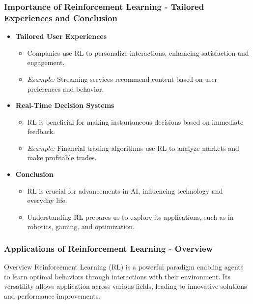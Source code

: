 \documentclass[aspectratio=169]{beamer}
\begin{document}
\begin{frame}[fragile]
  \frametitle{Importance of Reinforcement Learning - Tailored Experiences and Conclusion}
  \begin{itemize}
    \item \textbf{Tailored User Experiences}
      \begin{itemize}
        \item Companies use RL to personalize interactions, enhancing satisfaction and engagement.
        \item \textit{Example:} Streaming services recommend content based on user preferences and behavior.
      \end{itemize}
    
    \item \textbf{Real-Time Decision Systems}
      \begin{itemize}
        \item RL is beneficial for making instantaneous decisions based on immediate feedback.
        \item \textit{Example:} Financial trading algorithms use RL to analyze markets and make profitable trades.
      \end{itemize}
      
    \item \textbf{Conclusion}
      \begin{itemize}
        \item RL is crucial for advancements in AI, influencing technology and everyday life.
        \item Understanding RL prepares us to explore its applications, such as in robotics, gaming, and optimization.
      \end{itemize}
  \end{itemize}
\end{frame}

\begin{frame}[fragile]
    \frametitle{Applications of Reinforcement Learning - Overview}
    \begin{block}{Overview}
        Reinforcement Learning (RL) is a powerful paradigm enabling agents to learn optimal behaviors through interactions with their environment. Its versatility allows application across various fields, leading to innovative solutions and performance improvements.
    \end{block}
\end{frame}
\end{document}
